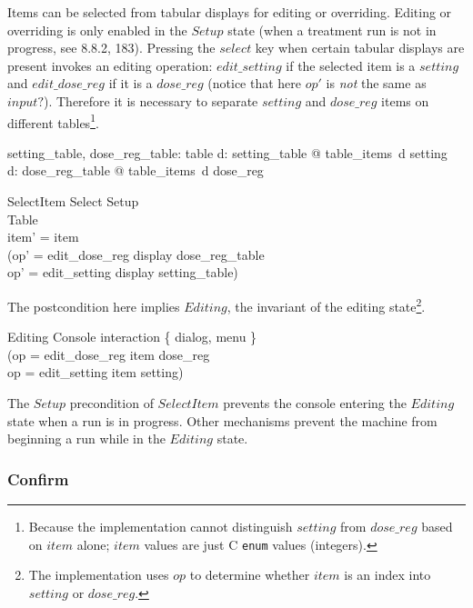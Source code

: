 \documentclass{article}
\begin{document}
Items can be selected from tabular displays for editing or overriding.
Editing or overriding is only enabled in the $Setup$ state (when a
treatment run is not in progress, see 8.8.2, 183).  Pressing the
$select$ key when certain tabular displays are present invokes an
editing operation: $edit\_setting$ if the selected item is a $setting$
and $edit\_dose\_reg$ if it is a $dose\_reg$ (notice that here $op'$ is
{\em not} the same as $input?$).  Therefore it is necessary to
separate $setting$ and $dose\_reg$ items on different
tables\footnote{Because the implementation cannot distinguish
$setting$ from $dose\_reg$ based on $item$ alone; $item$ values are
just C {\tt enum} values (integers).}.

\begin{axdef}
	setting\_table, dose\_reg\_table: \power table
\where
	\forall d: setting\_table @ table\_items~d \subseteq setting \\
	\forall d: dose\_reg\_table @ table\_items~d \subseteq dose\_reg \\
\end{axdef}

\begin{schema}{SelectItem}
	Select
\where
	Setup \\
	Table \\
	item' = item \\
	(op' = edit\_dose\_reg \land display \in dose\_reg\_table \lor \\
	op' = edit\_setting \land display \in setting\_table)
\end{schema}
The postcondition here implies $Editing$, the invariant of the editing
state\footnote{The implementation uses $op$ to determine whether
$item$ is an index into $setting$ or $dose\_reg$.}.

\begin{schema}{Editing}
	Console
\where
	interaction \in \{ dialog, menu \} \\
	(op = edit\_dose\_reg \land item \in dose\_reg \lor \\
	op = edit\_setting \land item \in setting)
\end{schema}
The $Setup$ precondition of $SelectItem$ prevents the console entering
the $Editing$ state when a run is in progress.  Other mechanisms
prevent the machine from beginning a run while in the $Editing$ state.

\subsubsection{Confirm}
\end{document}
